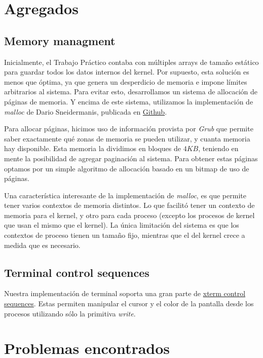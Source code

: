 \documentclass[a4paper,10pt]{article}
\begin{document}
\newpage
\section{Agregados}
\subsection{Memory managment}
Inicialmente, el Trabajo Práctico contaba con múltiples arrays de tamaño estático para guardar todos los datos internos del kernel.
Por supuesto, esta solución es menos que óptima, ya que genera un desperdicio de memoria e impone límites arbitrarios al sistema.
Para evitar esto, desarrollamos un sistema de allocación de páginas de memoria.
Y encima de este sistema, utilizamos la implementación de \textit{malloc} de Dario Sneidermanis, publicada en \href{https://github.com/esneider/malloc}{Github}.

Para allocar páginas, hicimos uso de información provista por \textit{Grub} que permite saber exactamente qué zonas de memoria se pueden utilizar, 
y cuanta memoria hay disponible.
Esta memoria la dividimos en bloques de $4KB$, teniendo en mente la posibilidad de agregar paginación al sistema.
Para obtener estas páginas optamos por un simple algoritmo de allocación basado en un bitmap de uso de páginas.

Una característica interesante de la implementación de \textit{malloc}, es que permite tener varios contextos de memoria distintos.
Lo que facilitó tener un contexto de memoria para el kernel, y otro para cada proceso (excepto los procesos de kernel que usan el mismo que el kernel).
La única limitación del sistema es que los contextos de proceso tienen un tamaño fijo, mientras que el del kernel crece a medida que es necesario.

\subsection{Terminal control sequences}
Nuestra implementación de terminal soporta una gran parte de \href{http://invisible-island.net/xterm/ctlseqs/ctlseqs.html}{xterm control sequences}.
Estas permiten manipular el cursor y el color de la pantalla desde los procesos utilizando sólo la primitiva \textit{write}.

\newpage
\section{Problemas encontrados}
\end{document}
